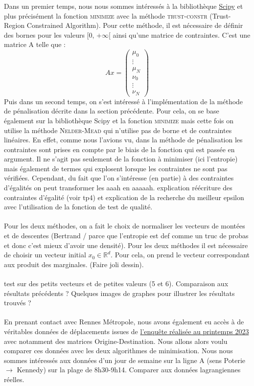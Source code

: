 \documentclass[12pt]{article}
\newcommand{\Rd}{\mathbb{R}^d}
\begin{document}
Dans un premier temps, nous nous sommes intéressés à la bibliothèque \href{https://docs.scipy.org/doc/scipy/tutorial/optimize.html#id21}{Scipy} et plus précisément la fonction \textsc{minimize} avec la méthode \textsc{trust-constr} (Trust-Region Constrained Algorithm). Pour cette méthode, il est nécessaire de définir des bornes pour les valeurs [0, $+\infty$[ ainsi qu'une matrice de contraintes. C'est une matrice A telle que :
\[
Ax =
\begin{pmatrix}
\mu_0\\
\vdots\\
\mu_N\\
\nu_0\\
\vdots\\
\nu_N
\end{pmatrix}
\]
Puis dans un second temps, on s'est intéressé à l'implémentation de la méthode de pénalisation décrite dans la section précédente. Pour cela, on se base également sur la bibliothèque Scipy et la fonction \textsc{minimize} mais cette fois on utilise la méthode \textsc{Nelder-Mead} qui n'utilise pas de borne et de contraintes linéaires. En effet, comme nous l'avions vu, dans la méthode de pénalisation les contraintes sont prises en compte par le biais de la fonction qui est passée en argument. Il ne s'agit pas seulement de la fonction à minimiser (ici l'entropie) mais également de termes qui explosent lorsque les contraintes ne sont pas vérifiées. Cependant, du fait que l'on s'intéresse (en partie) à des contraintes d'égalités on peut transformer les aaah en aaaaah. explication réécriture des contraintes d'égalité (voir tp4) et explication de la recherche du meilleur epsilon avec l'utilisation de la fonction de test de qualité.\\
\\
Pour les deux méthodes, on a fait le choix de normaliser les vecteurs de montées et de descentes (Bertrand / parce que l'entropie est def comme un truc de probas et donc c'est mieux d'avoir une densité). Pour les deux méthodes il est nécessaire de choisir un vecteur initial $x_0 \in \Rd$. Pour cela, on prend le vecteur correspondant aux produit des marginales. (Faire joli dessin). \\
\\
test sur des petits vecteurs et de petites valeurs (5 et 6). Comparaison aux résultats précédents ? Quelques images de graphes pour illustrer les résultats trouvés ?\\
\\
En prenant contact avec Rennes Métropole, nous avons également eu accès à de véritables données de déplacements issues de  \href{https://metropole.rennes.fr/une-enquete-sur-les-deplacements-dans-le-reseau-star}{l'enquête réalisée au printemps 2023} avec notamment des matrices Origine-Destination. Nous allons alors voulu comparer ces données avec les deux algorithmes de minimisation. Nous nous sommes intéressés aux données d'un jour de semaine sur la ligne A (sens Poterie $\to$ Kennedy) sur la plage de 8h30-9h14. Comparer aux données lagrangiennes réelles.\\
\end{document}
